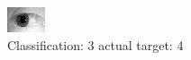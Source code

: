 \begin{figure}[h!]
\begin{center}
\includegraphics[width=0.60\columnwidth]{figures/ID1219_class_3_target_4.png}
\end{center}
\caption{ Classification: 3 actual target: 4}
\label{fig:ID1219_class_3_target_4}
\end{figure}
